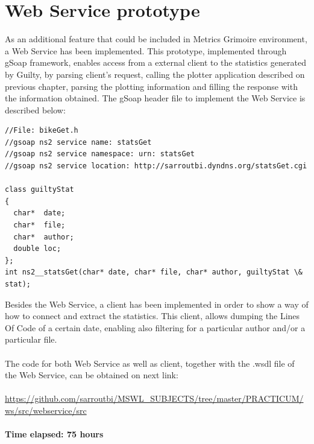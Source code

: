 \documentclass[11pt]{article}
\begin{document}
\section{Web Service prototype}
As an additional feature that could be included in Metrics Grimoire environment, a Web Service has been implemented. This prototype, implemented through gSoap framework, enables access from a external client to the statistics generated by Guilty, by parsing client's request, calling the plotter application described on previous chapter, parsing the plotting information and filling the response with the information obtained. The gSoap header file to implement the Web Service is described below:
\begin{verbatim}
//File: bikeGet.h
//gsoap ns2 service name: statsGet
//gsoap ns2 service namespace: urn: statsGet
//gsoap ns2 service location: http://sarroutbi.dyndns.org/statsGet.cgi

class guiltyStat
{
  char*  date;
  char*  file;
  char*  author;
  double loc;
};
int ns2__statsGet(char* date, char* file, char* author, guiltyStat \& stat);
\end{verbatim}
Besides the Web Service, a client has been implemented in order to show a way of how to connect and extract the statistics. This client, allows dumping the Lines Of Code of a certain date, enabling also filtering for a particular author and/or a particular file.\\
\\
The code for both Web Service as well as client, together with the .wsdl file of the Web Service, can be obtained on next link:\\
\\
\url{https://github.com/sarroutbi/MSWL_SUBJECTS/tree/master/PRACTICUM/ws/src/webservice/src}\\
\\
\textbf{Time elapsed: 75 hours}
\end{document}
